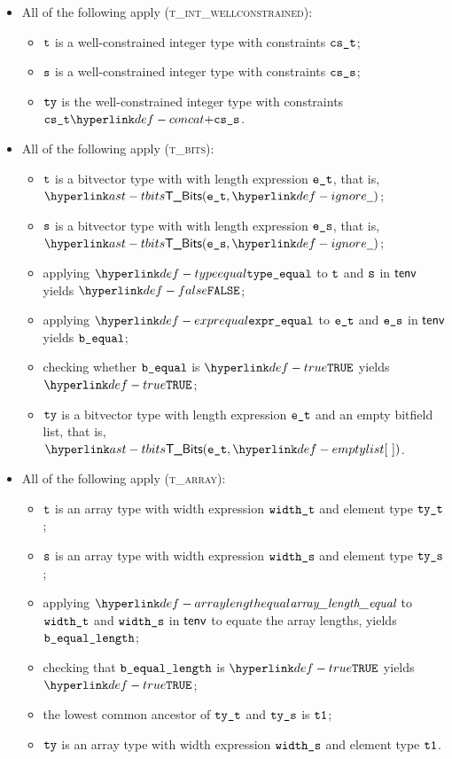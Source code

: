 \begin{itemize}
\begin{itemize}
    \item All of the following apply (\textsc{t\_int\_wellconstrained}):
    \begin{itemize}
      \item $\texttt{t}$ is a well-constrained integer type with constraints $\texttt{cs\_t}$;
      \item $\texttt{s}$ is a well-constrained integer type with constraints $\texttt{cs\_s}$;
      \item $\texttt{ty}$ is the well-constrained integer type with constraints $\cst \concat \css$.
    \end{itemize}

    \item All of the following apply (\textsc{t\_bits}):
    \begin{itemize}
      \item $\texttt{t}$ is a bitvector type with with length expression $\texttt{e\_t}$, that is, $\TBits(\vet, \Ignore)$;
      \item $\texttt{s}$ is a bitvector type with with length expression $\texttt{e\_s}$, that is, $\TBits(\ves, \Ignore)$;
      \item applying $\typeequal$ to $\texttt{t}$ and $\texttt{s}$ in $\textsf{tenv}$ yields $\False$;
      \item applying $\exprequal$ to $\texttt{e\_t}$ and $\texttt{e\_s}$ in $\textsf{tenv}$ yields $\texttt{b\_equal}$;
      \item checking whether $\texttt{b\_equal}$ is $\True$ yields $\True$\ProseTerminateAs{\NoLCA};
      \item $\texttt{ty}$ is a bitvector type with length expression $\texttt{e\_t}$ and an empty bitfield list, that is, $\TBits(\vet, \emptylist)$.
    \end{itemize}

    \item All of the following apply (\textsc{t\_array}):
    \begin{itemize}
      \item $\texttt{t}$ is an array type with width expression $\texttt{width\_t}$ and element type $\texttt{ty\_t}$;
      \item $\texttt{s}$ is an array type with width expression $\texttt{width\_s}$ and element type $\texttt{ty\_s}$;
      \item applying $\arraylengthequal$ to $\texttt{width\_t}$ and $\texttt{width\_s}$ in $\textsf{tenv}$ to equate the array lengths,
            yields $\texttt{b\_equal\_length}$\ProseOrTypeError;
      \item checking that $\texttt{b\_equal\_length}$ is $\True$ yields $\True$\ProseTerminateAs{\NoLCA};
      \item the lowest common ancestor of $\texttt{ty\_t}$ and $\texttt{ty\_s}$ is $\texttt{t1}$\ProseOrTypeError;
      \item $\texttt{ty}$ is an array type with width expression $\texttt{width\_s}$ and element type $\texttt{t1}$.
    \end{itemize}


\end{itemize}
\end{itemize}
